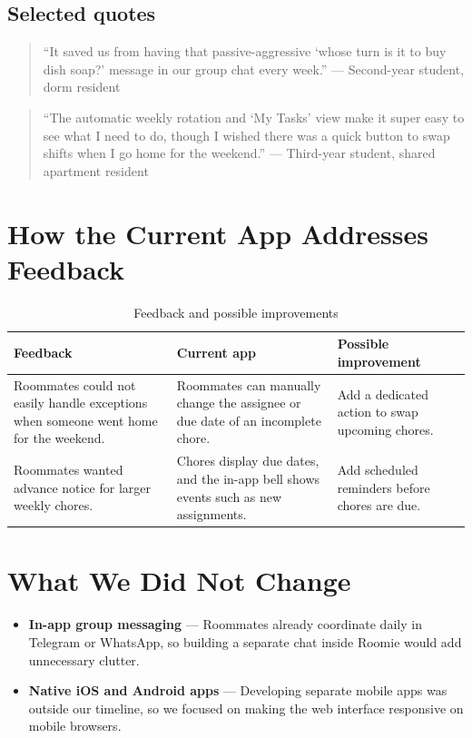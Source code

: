 \documentclass[11pt,a4paper]{article}
\begin{document}
\subsection{Selected quotes}
\begin{quote}
``It saved us from having that passive-aggressive `whose turn is it to buy dish soap?' message in our group chat every week.'' --- Second-year student, dorm resident
\end{quote}
\begin{quote}
``The automatic weekly rotation and `My Tasks' view make it super easy to see what I need to do, though I wished there was a quick button to swap shifts when I go home for the weekend.'' --- Third-year student, shared apartment resident
\end{quote}

\section{How the Current App Addresses Feedback}

\begin{table}[h]
\centering
\begin{tabularx}{\textwidth}{X X X}
\toprule
\textbf{Feedback} & \textbf{Current app} & \textbf{Possible improvement} \\
\midrule
Roommates could not easily handle exceptions when someone went home for the weekend. & Roommates can manually change the assignee or due date of an incomplete chore. & Add a dedicated action to swap upcoming chores. \\
Roommates wanted advance notice for larger weekly chores. & Chores display due dates, and the in-app bell shows events such as new assignments. & Add scheduled reminders before chores are due. \\
\bottomrule
\end{tabularx}
\caption{Feedback and possible improvements}
\end{table}

\section{What We Did Not Change}
\begin{itemize}[noitemsep]
  \item \textbf{In-app group messaging} --- Roommates already coordinate daily in Telegram or WhatsApp, so building a separate chat inside Roomie would add unnecessary clutter.
  \item \textbf{Native iOS and Android apps} --- Developing separate mobile apps was outside our timeline, so we focused on making the web interface responsive on mobile browsers.
\end{itemize}
\end{document}
